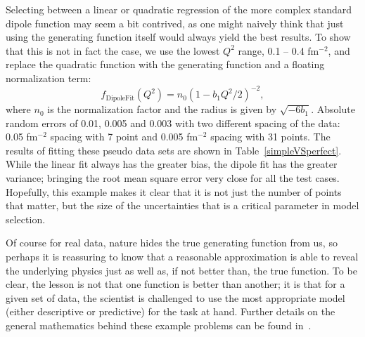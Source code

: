 \documentclass[10pt,aps,prc,twocolumn]{revtex4-1}
\begin{document}
Selecting between a linear or quadratic regression of the more complex standard dipole function may seem 
a bit contrived, as one might naively think that just using the generating function itself would always yield the
best results.   To show that this is not in fact the case, 
we use the lowest $Q^2$ range, 0.1 -- 0.4 fm$^{-2}$, and replace the quadratic function 
with the generating function and a floating normalization term:
\begin{equation}
\label{eq:fitdipole}
f_{{\mathrm{Dipole Fit}}}(Q^2) =  n_0 ( 1 - b_1 Q^2 / 2)^{-2},
\end{equation}
where $n_0$ is the normalization factor and the radius is given by $\sqrt{-6 b_1}$.
Absolute random errors of 0.01, 0.005 and 0.003 with two different spacing of the data: 
0.05 fm$^{-2}$ spacing with 7 point and 0.005 fm$^{-2}$ 
spacing with 31 points.       
The results of fitting these pseudo data sets are shown in Table~\ref{simpleVSperfect}.    
While the linear fit always has the greater bias, the dipole fit has the greater 
variance; bringing the root mean square error very close for all the test cases.   
Hopefully, this example makes it clear that it is not just the number of points that matter, 
but the size of the uncertainties that is a critical parameter in model selection.

Of course for real data, nature hides the true generating function from us, so perhaps it is reassuring to know
that a reasonable approximation is able to reveal the underlying physics just as well as, if not better than, the
true function.   
To be clear, the lesson is not that one function is better than another; it is that for a given set of data,
the scientist is challenged to use the most appropriate model (either descriptive or predictive) for
the task at hand.   Further details on the general mathematics behind these example problems can be 
found in~\cite{Shmueli:2010}.    
\end{document}

